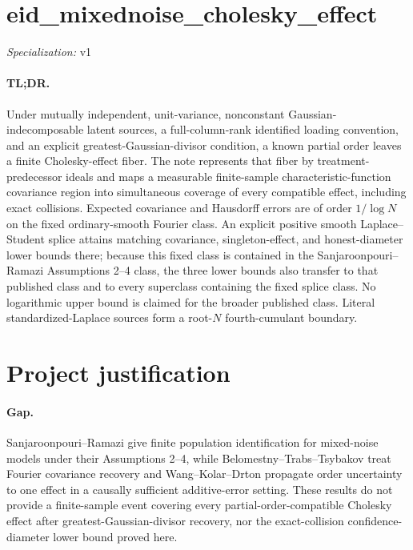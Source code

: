 \documentclass{article}
\begin{document}
\sloppy

\section*{eid\_\allowbreak{}mixednoise\_\allowbreak{}cholesky\_\allowbreak{}effect}

\noindent\textit{Specialization:} v1\par

\paragraph{TL;DR.} Under mutually independent, unit-variance, nonconstant Gaussian-indecomposable latent sources, a full-column-rank identified loading convention, and an explicit greatest-Gaussian-divisor condition, a known partial order leaves a finite Cholesky-effect fiber. The note represents that fiber by treatment-predecessor ideals and maps a measurable finite-sample characteristic-function covariance region into simultaneous coverage of every compatible effect, including exact collisions. Expected covariance and Hausdorff errors are of order \(1/\log N\) on the fixed ordinary-smooth Fourier class. An explicit positive smooth Laplace--Student splice attains matching covariance, singleton-effect, and honest-diameter lower bounds there; because this fixed class is contained in the Sanjaroonpouri--Ramazi Assumptions 2--4 class, the three lower bounds also transfer to that published class and to every superclass containing the fixed splice class. No logarithmic upper bound is claimed for the broader published class. Literal standardized-Laplace sources form a root-\(N\) fourth-cumulant boundary.

\section{Project justification}

\paragraph{Gap.} Sanjaroonpouri--Ramazi give finite population identification for mixed-noise models under their Assumptions 2--4, while Belomestny--Trabs--Tsybakov treat Fourier covariance recovery and Wang--Kolar--Drton propagate order uncertainty to one effect in a causally sufficient additive-error setting. These results do not provide a finite-sample event covering every partial-order-compatible Cholesky effect after greatest-Gaussian-divisor recovery, nor the exact-collision confidence-diameter lower bound proved here.
\end{document}
